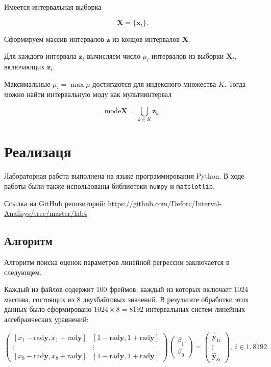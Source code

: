 \documentclass{article}
\begin{document}
  Имеется интервальная выборка

  \[
    \mathbf{X} = \{ \mathbf{x}_i \}.
  \]

  Сформируем массив интервалов \( \mathbf{z} \) из концов интервалов
  \( \mathbf{X} \).

  Для каждого интервала \( \mathbf{z}_i \) вычисляем число \( \mu_i \)
  интервалов из выборки \( \mathbf{X}_i \), включающих \( \mathbf{z}_i \).

  Максимальные \( \mu_i = \max \mu \) достигаются для индексного множества
  \( K \). Тогда можно найти интервальную моду как мультиинтервал

  \begin{equation}
    \text{mode} \mathbf{X} = \bigcup_{k \in K} \mathbf{z}_k.
  \end{equation}

  \section{Реализаця}

  Лабораторная работа выполнена на языке программирования Python. В ходе
  работы были также использованы библиотеки \verb!numpy! и
  \verb!matplotlib!.


  Ссылка на GitHub репозиторий:
  \url{https://github.com/Deforc/Interval-Analisys/tree/master/lab4}

  \subsection{Алгоритм}
  Алгоритм поиска оценок параметров линейной регрессии заключается в следующем.

  Каждый из файлов содержит 100 фреймов, каждый из которых включает
  1024 массива, состоящих из 8 двухбайтовых значений. В результате
  обработки этих данных было сформировано \( 1024 \times 8 = 8192 \)
  интервальных систем линейных алгебраических уравнений: 

  \[
    \begin{pmatrix}
    [x_1 - \text{rad} \mathbf{y}, x_1 + \text{rad} \mathbf{y}] &
    [1 - \text{rad} \mathbf{y}, 1 + \text{rad} \mathbf{y}] \\
    \vdots & \vdots \\
    [x_8 - \text{rad} \mathbf{y}, x_8 + \text{rad} \mathbf{y}] &
    [1 - \text{rad} \mathbf{y}, 1 + \text{rad} \mathbf{y}]
    \end{pmatrix}
    \begin{pmatrix}
    \beta_1 \\
    \beta_0
    \end{pmatrix}
    = \begin{pmatrix}
    \hat{\mathbf{y}}_{1i} \\
    \vdots \\
    \hat{\mathbf{y}}_{8i}
    \end{pmatrix}, \ i \in \overline{1,8192}
  \]
\end{document}
